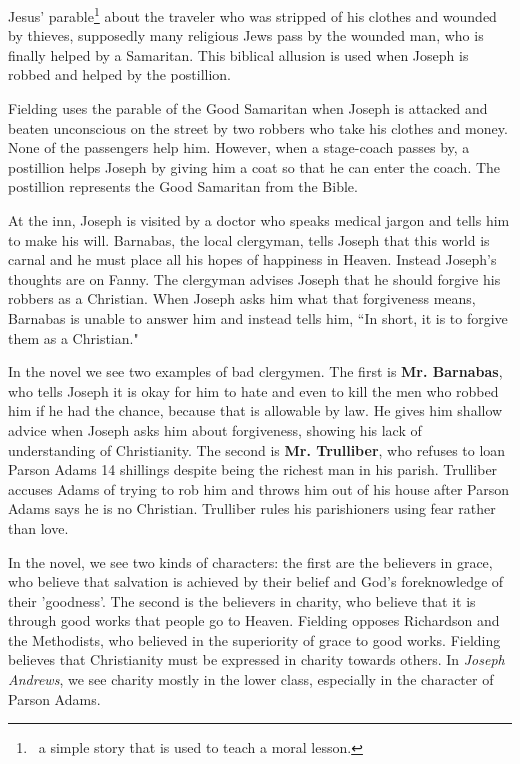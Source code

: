 \documentclass[12pt, a4paper]{article}
\begin{document}

\ind Jesus' parable\footnote{\, a simple story that is used to teach a moral lesson.}
about the traveler who was stripped of his clothes and wounded by thieves, 
supposedly many religious Jews pass by the wounded man, who is finally helped by 
a Samaritan. This biblical allusion is used  when Joseph is robbed 
and helped by the postillion.



Fielding uses the parable of the Good Samaritan when Joseph is attacked
and beaten unconscious on the street by two robbers who take his clothes and money.
None of the passengers help him. However, when a stage-coach passes by, a postillion helps Joseph by
giving him a coat so that he can enter the coach. The postillion represents the Good Samaritan from
the Bible.



\ind At the inn, Joseph is visited by a doctor who speaks medical jargon and
tells him to make his will. Barnabas, the local clergyman, tells Joseph
that this world is carnal and he must place all his hopes of happiness in
Heaven. Instead Joseph's thoughts are on Fanny. The clergyman advises
Joseph that he should forgive his robbers as a Christian. When Joseph
asks him what that forgiveness means, Barnabas is unable to answer him and
instead tells him, “In short, it is to forgive them as a Christian."


\ind In the novel we see two examples of bad clergymen. The first is \textbf{Mr. Barnabas},
who tells Joseph it is okay for 
him to hate and even to kill the men who robbed him if he had the chance, because that is 
allowable by law. He gives him  shallow advice when Joseph asks him about forgiveness, showing
his lack of understanding of Christianity. The second is \textbf{Mr. Trulliber}, who refuses to loan Parson Adams 
14 shillings despite being the richest man in his parish. Trulliber accuses Adams of trying to rob 
him and throws him out of his house after Parson Adams says he is no Christian. Trulliber rules his parishioners 
using fear rather than love.


\ind In the novel, we see two kinds of characters: the first are
the believers in grace, who believe that salvation is achieved by
their belief and God's foreknowledge of their 'goodness'. The second
is the believers in charity, who believe that it is through good works
that people go to Heaven. Fielding opposes Richardson and the Methodists,
who believed in the superiority of grace to good works. Fielding
believes that Christianity must be expressed in charity towards
others. In \textit{Joseph Andrews}, we see charity mostly in the lower class,
especially in the character of Parson Adams.
\end{document}
